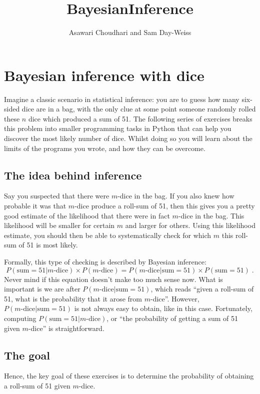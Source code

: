 \documentclass[11pt, oneside]{article}   	%
\title{BayesianInference}
\author{Asawari Choudhari and Sam Day-Weiss}
\begin{document}
\section{Bayesian inference with dice}
Imagine a classic scenario in statistical inference: you are to guess how many six-sided dice are in a bag, with the only clue at some point someone randomly rolled these $n$ dice which produced a sum of 51. The following series of exercises breaks this problem into smaller programming tasks in Python that can help you discover the most likely number of dice. Whilst doing so you will learn about the limits of the programs you wrote, and how they can be overcome.

\subsection*{The idea behind inference}
Say you suspected that there were $m$-dice in the bag. If you also knew how probable it was that $m$-dice produce a roll-sum of 51, then this gives you a pretty good estimate of the likelihood that there were in fact $m$-dice in the bag. This likelihood will be smaller for certain $m$ and larger for others. Using this likelihood estimate, you should then be able to systematically check for which $m$ this roll-sum of 51 is most likely.

Formally, this type of checking is described by Bayesian inference:
\begin{equation}
P(\text{sum}=51| m\text{-dice})  \times P(m\text{-dice}) = P(m \text{-dice}| \text{sum}=51)  \times P(\text{sum}=51)\;. \label{eqn:dice_bayes_rule1}
\end{equation}
Never mind if this equation doesn't make too much sense now. What is important is we are after $P(m \text{-dice}| \text{sum}=51)$, which reads ``given a roll-sum of 51, what is the probability that it arose from $m$-dice''. However, $P(m \text{-dice}| \text{sum}=51)$ is not always easy to obtain, like in this case. Fortunately, computing $P(\text{sum}=51| m\text{-dice})$, or ``the probability of getting a sum of 51 given $m$-dice'' is straightforward. 

\subsection*{The goal}
Hence, the key goal of these exercises is to determine the probability of obtaining a roll-sum of 51 given $m$-dice.
\end{document}
